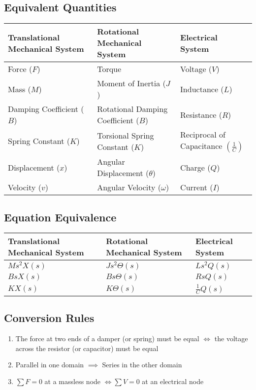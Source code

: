 \subsection*{Equivalent Quantities}
\begin{center}
  \begin{tabularx}{\textwidth}{XXX}
    \hline
    Translational Mechanical System & Rotational Mechanical System & Electrical System \\
    \hline
    Force ($F$) & Torque & Voltage ($V$)\\
    Mass ($M$) & Moment of Inertia ($J$) & Inductance ($L$)\\
    Damping Coefficient ($B$) & Rotational Damping Coefficient ($B$) & Resistance ($R$)\\
    Spring Constant ($K$) & Torsional Spring Constant ($K$) & Reciprocal of Capacitance $\left( \frac{1}{C} \right)$\\
    Displacement ($x$) & Angular Displacement ($\theta$) & Charge ($Q$)\\
    Velocity ($v$) & Angular Velocity ($\omega$) & Current ($I$)
  \end{tabularx}
\end{center}
\subsection*{Equation Equivalence}
\begin{center}
  \begin{tabularx}{\textwidth}{XXX}
    \hline
    Translational Mechanical System & Rotational Mechanical System & Electrical System \\
    \hline
    $Ms^2X(s)$ & $Js^2\Theta(s)$ & $Ls^2Q(s)$\\
    $BsX(s)$ & $Bs\Theta(s)$ & $RsQ(s)$\\
    $KX(s)$ & $K\Theta(s)$ & $\frac{1}{C}Q(s)$\\
  \end{tabularx}
\end{center}
\subsection*{Conversion Rules}
\begin{enumerate}
  \item The force at two ends of a damper (or spring) must be equal $\Leftrightarrow$ the voltage across the resistor (or capacitor) must be equal
  \item Parallel in one domain $\implies$ Series in the other domain
  \item $\sum F = 0$ at a massless node $\Leftrightarrow \sum V = 0$ at an electrical node
\end{enumerate}
